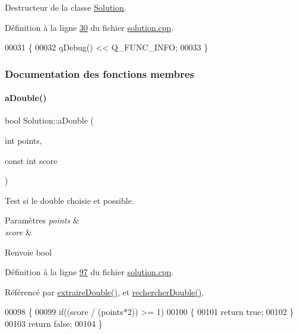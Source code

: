 Destructeur de la classe \hyperlink{class_solution}{Solution}. 



Définition à la ligne \hyperlink{solution_8cpp_source_l00030}{30} du fichier \hyperlink{solution_8cpp_source}{solution.\+cpp}.


\begin{DoxyCode}
00031 \{
00032    qDebug() << Q\_FUNC\_INFO;
00033 \}
\end{DoxyCode}


\subsubsection{Documentation des fonctions membres}
\mbox{\label{class_solution_ad79929c887a394883a154ea2ca9c3aac}} 
\paragraph{\texorpdfstring{a\+Double()}{aDouble()}}
{\footnotesize\ttfamily bool Solution\+::a\+Double (\begin{DoxyParamCaption}\item[{int}]{points,  }\item[{const int}]{score }\end{DoxyParamCaption})\hspace{0.3cm}{\ttfamily [private]}}



Test si le double choisie et possible. 


\begin{DoxyParams}{Paramètres}
{\em points} & \\
\hline
{\em score} & \\
\hline
\end{DoxyParams}
\begin{DoxyReturn}{Renvoie}
bool 
\end{DoxyReturn}


Définition à la ligne \hyperlink{solution_8cpp_source_l00097}{97} du fichier \hyperlink{solution_8cpp_source}{solution.\+cpp}.



Référencé par \hyperlink{solution_8cpp_source_l00198}{extraire\+Double()}, et \hyperlink{solution_8cpp_source_l00114}{rechercher\+Double()}.


\begin{DoxyCode}
00098 \{
00099     \textcolor{keywordflow}{if}((score / (points*2)) >= 1)
00100     \{
00101         \textcolor{keywordflow}{return} \textcolor{keyword}{true};
00102     \}
00103     \textcolor{keywordflow}{return} \textcolor{keyword}{false};
00104 \}
\end{DoxyCode}
\mbox{\label{class_solution_a932ab2aea629d049202e8f8e38cc01b3}} 
